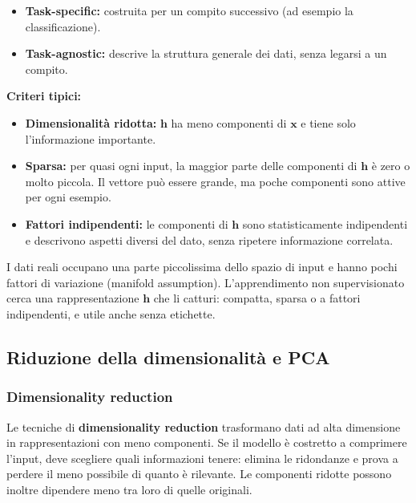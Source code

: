 \documentclass[11pt,a4paper]{article}
\begin{document}
\begin{itemize}
  \item \textbf{Task-specific:} costruita per un compito successivo
        (ad esempio la classificazione).
  \item \textbf{Task-agnostic:} descrive la struttura generale dei dati, senza
        legarsi a un compito.
\end{itemize}

\textbf{Criteri tipici:}
\begin{itemize}
  \item \textbf{Dimensionalità ridotta:} $\mathbf{h}$ ha meno componenti di
        $\mathbf{x}$ e tiene solo l'informazione importante.
  \item \textbf{Sparsa:} per quasi ogni input, la maggior parte delle
        componenti di $\mathbf{h}$ è zero o molto piccola. Il vettore può
        essere grande, ma poche componenti sono attive per ogni esempio.
  \item \textbf{Fattori indipendenti:} le componenti di $\mathbf{h}$ sono
        statisticamente indipendenti e descrivono aspetti diversi del dato,
        senza ripetere informazione correlata.
\end{itemize}

\begin{importante}
I dati reali occupano una parte piccolissima dello spazio di input e hanno pochi
fattori di variazione (manifold assumption). L'apprendimento non supervisionato
cerca una rappresentazione $\mathbf{h}$ che li catturi: compatta, sparsa o a
fattori indipendenti, e utile anche senza etichette.
\end{importante}

\subsection{Riduzione della dimensionalità e PCA}

\subsubsection{Dimensionality reduction}
Le tecniche di \textbf{dimensionality reduction} trasformano dati ad alta
dimensione in rappresentazioni con meno componenti. Se il modello è costretto
a comprimere l'input, deve scegliere quali informazioni tenere: elimina le
ridondanze e prova a perdere il meno possibile di quanto è rilevante. Le
componenti ridotte possono inoltre dipendere meno tra loro di quelle originali.
\end{document}
